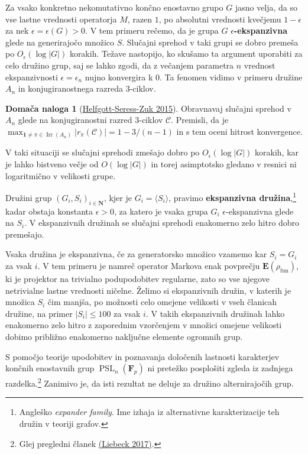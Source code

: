 \documentclass[11pt]{book}
\def\NN{\mathbf{N}}
\def\conclass{\mathcal{C}}
\def\oneone{\mathbf{1}}
\def\FF{\mathbf{F}}
\def\EE{\mathbf{E}}
\DeclareMathOperator\Irr{Irr}
\DeclareMathOperator\fun{fun}
\DeclareMathOperator\PSL{PSL}
\def\definicija{\color{rdeca}\bf}
\theoremstyle{definition}
\theoremstyle{zgled}
\theoremstyle{zgledbrezstevilke}
\theoremstyle{odprtproblem}
\theoremstyle{domacanaloga}
\newtheorem{domacanaloga}[theorem]{Domača naloga}
\theoremstyle{izrek}
\begin{document}
Za vsako konkretno nekomutativno končno enostavno grupo $G$ jasno velja, da so vse lastne vrednosti operatorja $M$, razen $1$, po absolutni vrednosti kvečjemu $1-\epsilon$ za nek $\epsilon = \epsilon(G) > 0$. V tem primeru rečemo, da je grupa $G$ {\definicija $\epsilon$-ekspanzivna} glede na generirajočo množico $S$. Slučajni sprehod v taki grupi se dobro premeša po $O_{\epsilon}(\log |G|)$ korakih. Težave nastopijo, ko skušamo ta argument uporabiti za celo družino grup, saj se lahko zgodi, da z večanjem parametra $n$ vrednost ekspanzivnosti $\epsilon = \epsilon_n$ nujno konvergira k $0$. Ta fenomen vidimo v primeru družine $A_n$ in konjugiranostnega razreda $3$-ciklov. 

\begin{domacanaloga}[\href{https://www.sciencedirect.com/science/article/pii/S0021869314004797}{Helfgott-Seress-Zuk 2015}]
    Obravnavaj slučajni sprehod v $A_n$ glede na konjugiranostni razred $3$-ciklov $\conclass$. Premisli, da je $\max_{\oneone \neq \pi \in \Irr(A_n)} |r_{\pi}(\conclass)| = 1 - 3/(n-1)$ in s tem oceni hitrost konvergence.
    \end{domacanaloga}

V taki situaciji se slučajni sprehodi zmešajo dobro po $O_{\epsilon}(\log |G|)$ korakih, kar je lahko bistveno večje od $O(\log |G|)$ in torej asimptotsko gledano v resnici ni logaritmično v velikosti grupe.

Družini grup $(G_i, S_i)_{i \in \NN}$, kjer je $G_i = \langle S_i \rangle$, pravimo {\definicija ekspanzivna družina},\footnote{Angleško \emph{expander family}. Ime izhaja iz alternativne karakterizacije teh družin v teoriji grafov.} kadar obstaja konstanta $\epsilon > 0$, za katero je vsaka grupa $G_i$ $\epsilon$-ekspanzivna  glede na $S_i$. V ekspanzivnih družinah se slučajni sprehodi enakomerno zelo hitro dobro premešajo.

Vsaka družina je ekspanzivna, če za generatorsko množico vzamemo kar $S_i = G_i$ za vsak $i$. V tem primeru je namreč operator Markova enak povprečju $\EE(\rho_{\fun})$, ki je projektor na trivialno podupodobitev regularne, zato so vse njegove netrivialne lastne vrednosti ničelne. Želimo si ekspanzivnih družin, v katerih je množica $S_i$ čim manjša, po možnosti celo omejene velikosti v vseh članicah družine, na primer $|S_i| \leq 100$ za vsak $i$. V takih ekspanzivnih družinah lahko enakomerno zelo hitro z zaporednim vzorčenjem v množici omejene velikosti dobimo približno enakomerno naključne elemente ogromnih grup.

S pomočjo teorije upodobitev in poznavanja določenih lastnosti karakterjev končnih enostavnih grup $\PSL_n(\FF_p)$ ni pretežko posplošiti zgleda iz zadnjega razdelka.\footnote{Glej pregledni članek \href{https://www.ma.imperial.ac.uk/~mwl/princeton-survey-final.pdf}{(Liebeck 2017)}.} Zanimivo je, da isti rezultat ne deluje za družino alternirajočih grup. 
\end{document}
